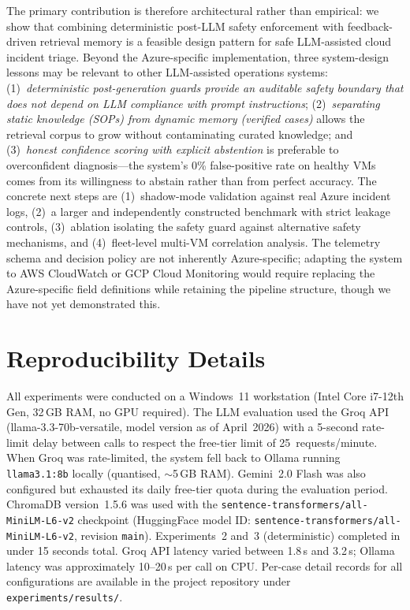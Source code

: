 \documentclass[a4paper,10pt,journal,compsoc]{IEEEtran}
\begin{document}
The primary contribution is therefore architectural rather than
empirical: we show that combining deterministic post-LLM safety
enforcement with feedback-driven retrieval memory is a feasible design
pattern for safe LLM-assisted cloud incident triage. Beyond the
Azure-specific implementation, three system-design lessons may be
relevant to other LLM-assisted operations systems: (1)~\emph{deterministic
post-generation guards provide an auditable safety boundary that does
not depend on LLM compliance with prompt instructions};
(2)~\emph{separating static knowledge (SOPs) from dynamic
memory (verified cases)} allows the retrieval corpus to grow without
contaminating curated knowledge; and (3)~\emph{honest confidence
scoring with explicit abstention} is preferable to overconfident
diagnosis---the system's 0\% false-positive rate on healthy VMs comes
from its willingness to abstain rather than from perfect accuracy.
The concrete next steps are (1)~shadow-mode validation against real
Azure incident logs, (2)~a larger and independently constructed
benchmark with strict leakage controls, (3)~ablation isolating the
safety guard against alternative safety mechanisms, and
(4)~fleet-level multi-VM correlation analysis. The telemetry schema
and decision policy are not inherently Azure-specific; adapting the
system to AWS CloudWatch or GCP Cloud Monitoring would require
replacing the Azure-specific field definitions while retaining the
pipeline structure, though we have not yet demonstrated this.

\section*{Reproducibility Details}

All experiments were conducted on a Windows~11 workstation (Intel
Core i7-12th Gen, 32\,GB RAM, no GPU required). The LLM evaluation
used the Groq API (llama-3.3-70b-versatile, model version as of
April~2026) with a 5-second rate-limit delay between calls to respect
the free-tier limit of 25~requests/minute. When Groq was rate-limited,
the system fell back to Ollama running \texttt{llama3.1:8b} locally
(quantised, $\sim$5\,GB RAM). Gemini~2.0 Flash was also configured
but exhausted its daily free-tier quota during the evaluation period.
ChromaDB version~1.5.6 was used with the
\texttt{sentence-transformers/all-MiniLM-L6-v2} checkpoint
(HuggingFace model ID: \texttt{sentence-transformers/all-MiniLM-L6-v2},
revision \texttt{main}). Experiments~2 and~3 (deterministic) completed
in under 15 seconds total. Groq API latency varied between 1.8\,s and
3.2\,s; Ollama latency was approximately 10--20\,s per call on CPU.
Per-case detail records for all configurations are available in the
project repository under \texttt{experiments/results/}.
\end{document}
